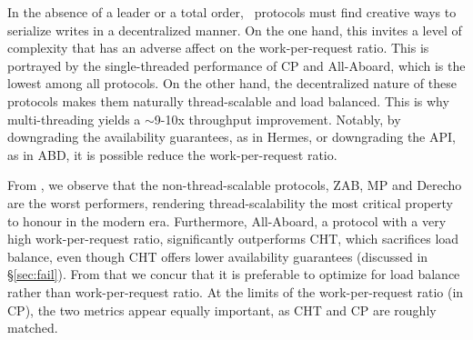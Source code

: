 In the absence of a leader or a total order, \DPKO\ protocols must find creative ways to serialize writes in a decentralized manner.
On the one hand, this invites a level of complexity that has an adverse affect on the work-per-request ratio. 
This is portrayed by the single-threaded performance of CP and All-Aboard, which is the lowest among all protocols.
On the other hand, the decentralized nature of these protocols makes them
naturally thread-scalable and load balanced. This is why multi-threading yields a $\sim$9-10x throughput improvement.
Notably, by downgrading the availability guarantees, as in Hermes, or downgrading the API, as in ABD, it is possible reduce the work-per-request ratio.

From , we observe that the non-thread-scalable protocols, ZAB, MP and Derecho are the worst performers, rendering thread-scalability the most critical property to honour in the modern era.
Furthermore, All-Aboard, a protocol with a very high work-per-request ratio, significantly outperforms CHT, which sacrifices load balance, even though CHT offers lower availability guarantees (discussed in \S\ref{sec:fail}).
From that we concur that it is preferable to optimize for load balance rather than work-per-request ratio. At the limits of the work-per-request ratio (\ie in CP), the two metrics appear equally important, as CHT and CP are roughly matched.




